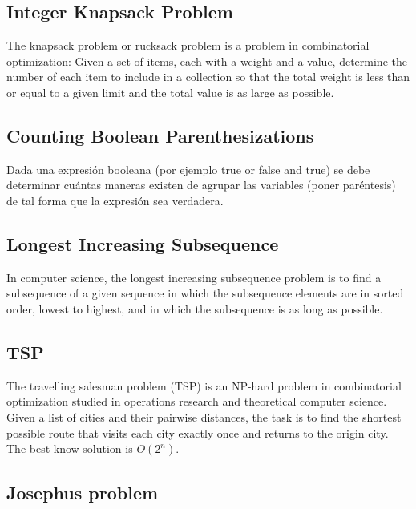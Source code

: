 \documentclass[10pt,letterpaper,twocolumn,twosided]{article}
\newcommand{\codigofuente}[1]{

\dotfill
}
\begin{document}
\codigofuente{src/dp/edit_distance.cpp}

\subsection{Integer Knapsack Problem}

The knapsack problem or rucksack problem is a problem in combinatorial optimization: Given a set of items, each with a weight and a value, determine the number of each item to include in a collection so that the total weight is less than or equal to a given limit and the total value is as large as possible.

\codigofuente{src/dp/knapsack.cpp}

\subsection{Counting Boolean Parenthesizations}

Dada una expresión booleana (por ejemplo true or false and true) se debe determinar cuántas maneras existen de agrupar las variables (poner paréntesis) de tal forma que la expresión sea verdadera.

\subsection{Longest Increasing Subsequence}

In computer science, the longest increasing subsequence problem is to find a subsequence of a given sequence in which the subsequence elements are in sorted order, lowest to highest, and in which the subsequence is as long as possible.

\codigofuente{src/dp/lis.cpp}

\subsection{TSP}

The travelling salesman problem (TSP) is an NP-hard problem in combinatorial optimization studied in operations research and theoretical computer science. Given a list of cities and their pairwise distances, the task is to find the shortest possible route that visits each city exactly once and returns to the origin city. The best know solution is $O(2^n)$.

\codigofuente{src/dp/tsp.cpp}

\subsection{Josephus problem}
\end{document}
